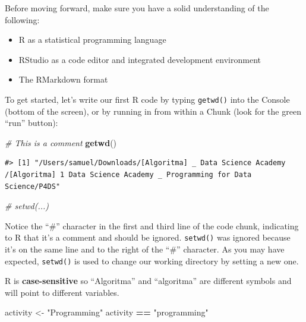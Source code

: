 \documentclass[]{article}
\newenvironment{Shaded}{\begin{snugshade}}{\end{snugshade}}
\newcommand{\CommentTok}[1]{\textcolor[rgb]{0.56,0.35,0.01}{\textit{#1}}}
\newcommand{\KeywordTok}[1]{\textcolor[rgb]{0.13,0.29,0.53}{\textbf{#1}}}
\newcommand{\NormalTok}[1]{#1}
\newcommand{\OperatorTok}[1]{\textcolor[rgb]{0.81,0.36,0.00}{\textbf{#1}}}
\newcommand{\StringTok}[1]{\textcolor[rgb]{0.31,0.60,0.02}{#1}}
\providecommand{\tightlist}{%
  \setlength{\itemsep}{0pt}\setlength{\parskip}{0pt}}
\begin{document}
Before moving forward, make sure you have a solid understanding of the
following:

\begin{itemize}
\tightlist
\item
  R as a statistical programming language\\
\item
  RStudio as a code editor and integrated development environment
\item
  The RMarkdown format
\end{itemize}

To get started, let's write our first R code by typing \texttt{getwd()}
into the Console (bottom of the screen), or by running in from within a
Chunk (look for the green ``run'' button):

\begin{Shaded}
\begin{Highlighting}[]
\CommentTok{# This is a comment}
\KeywordTok{getwd}\NormalTok{()}
\end{Highlighting}
\end{Shaded}

\begin{verbatim}
#> [1] "/Users/samuel/Downloads/[Algoritma] _ Data Science Academy /[Algoritma] 1 Data Science Academy _ Programming for Data Science/P4DS"
\end{verbatim}

\begin{Shaded}
\begin{Highlighting}[]
\CommentTok{# setwd(...)}
\end{Highlighting}
\end{Shaded}

Notice the ``\#'' character in the first and third line of the code
chunk, indicating to R that it's a comment and should be ignored.
\texttt{setwd()} was ignored because it's on the same line and to the
right of the ``\#'' character. As you may have expected,
\texttt{setwd()} is used to change our working directory by setting a
new one.

R is \textbf{case-sensitive} so ``Algoritma'' and ``algoritma'' are
different symbols and will point to different variables.

\begin{Shaded}
\begin{Highlighting}[]
\NormalTok{activity <-}\StringTok{ "Programming"}
\NormalTok{activity }\OperatorTok{==}\StringTok{ "programming"}
\end{Highlighting}
\end{Shaded}
\end{document}
